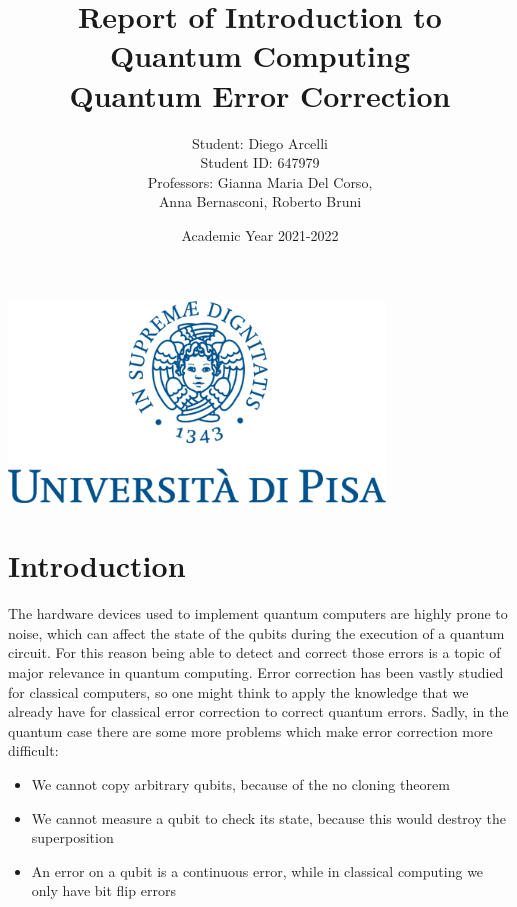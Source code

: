 \documentclass{article}
\begin{document}
	
	\begin{titlepage}
		
		\title{Report of Introduction to Quantum Computing \\ Quantum Error Correction}
		\author{Student: Diego Arcelli\\ Student ID: 647979 \\
			Professors: Gianna Maria Del Corso,\\Anna Bernasconi, Roberto Bruni}
		\date{Academic Year 2021-2022}
		\maketitle
		\centering
		\includegraphics[width=10cm]{./images/unipi_logo.png}
		
	\end{titlepage}
	\newpage
	
	\section{Introduction}
	 
	The hardware devices used to implement quantum computers are highly prone to noise, which can affect the state of the qubits during the execution of a quantum circuit. For this reason being able to detect and correct those errors is a topic of major relevance in quantum computing. Error correction has been vastly studied for classical computers, so one might think to apply the knowledge that we already have for classical error correction to correct quantum errors. Sadly, in the quantum case there are some more problems which make error correction more difficult:
	\begin{itemize}
		\item We cannot copy arbitrary qubits, because of the no cloning theorem
		\item We cannot measure a qubit to check its state, because this would destroy the superposition
		\item An error on a qubit is a continuous error, while in classical computing we only have bit flip errors
	\end{itemize}	
	
\end{document}
